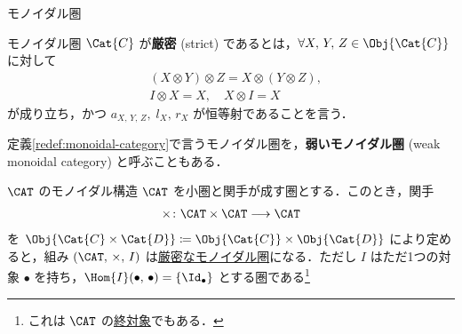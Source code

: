 \documentclass[TQFT_main]{subfiles}
\begin{document}
\begin{mydef}[label=redef:monoidal-category,breakable]{モノイダル圏}
\begin{description}
        \begin{center}
        \end{center}
        
    \end{description}
    
    \tcblower

    モノイダル圏 $\Cat{C}$ が\textbf{厳密} (strict) であるとは，$\forall X,\, Y,\, Z \in \Obj{\Cat{C}}$ に対して
    \begin{align}
        &(X \otimes Y) \otimes Z = X \otimes (Y \otimes Z), \\
        &I \otimes X = X,\quad X \otimes I = X
    \end{align}
    が成り立ち，かつ $a_{X,\, Y,\, Z},\; l_{X},\, r_X$ が恒等射であることを言う．
\end{mydef}

\begin{marker}
    定義\ref{redef:monoidal-category}で言うモノイダル圏を，\textbf{弱いモノイダル圏} (weak monoidal category) と呼ぶこともある．
\end{marker}

\begin{myexample}[label=ex:Cat-monidal]{$\CAT$ のモノイダル構造}
    $\CAT$ を小圏と関手が成す圏とする．このとき，関手
    \begin{align}
        \times \colon \CAT \times \CAT \lto \CAT
    \end{align}
    を $\Obj{\Cat{C} \times \Cat{D}} \coloneqq \Obj{\Cat{C}} \times \Obj{\Cat{D}}$ により定めると，組み $(\CAT,\, \times,\, I)$ は\hyperref[redef:monoidal]{厳密なモノイダル圏}になる．ただし $I$ はただ1つの対象 $\bullet$ を持ち，$\Hom{I}(\bullet,\,\bullet) = \{\Id_{\bullet}\}$ とする圏である\footnote{これは $\CAT$ の\hyperref[def:colim]{終対象}でもある．}
\end{myexample}
\end{document}
